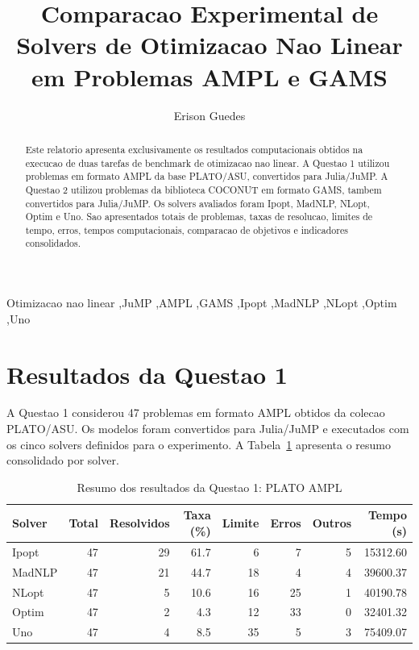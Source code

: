 \documentclass[preprint,12pt]{elsarticle}
\begin{document}
\begin{frontmatter}

\title{Comparacao Experimental de Solvers de Otimizacao Nao Linear em Problemas AMPL e GAMS}

\author[inst1]{Erison Guedes}
\address[inst1]{Programa de Mestrado, Disciplina de Otimizacao}

\begin{abstract}
Este relatorio apresenta exclusivamente os resultados computacionais obtidos na execucao de duas tarefas de benchmark de otimizacao nao linear. A Questao 1 utilizou problemas em formato AMPL da base PLATO/ASU, convertidos para Julia/JuMP. A Questao 2 utilizou problemas da biblioteca COCONUT em formato GAMS, tambem convertidos para Julia/JuMP. Os solvers avaliados foram Ipopt, MadNLP, NLopt, Optim e Uno. Sao apresentados totais de problemas, taxas de resolucao, limites de tempo, erros, tempos computacionais, comparacao de objetivos e indicadores consolidados.
\end{abstract}

\begin{keyword}
Otimizacao nao linear \sep JuMP \sep AMPL \sep GAMS \sep Ipopt \sep MadNLP \sep NLopt \sep Optim \sep Uno
\end{keyword}

\end{frontmatter}

\section{Resultados da Questao 1}

A Questao 1 considerou 47 problemas em formato AMPL obtidos da colecao PLATO/ASU. Os modelos foram convertidos para Julia/JuMP e executados com os cinco solvers definidos para o experimento. A Tabela~\ref{tab:q1_resumo} apresenta o resumo consolidado por solver.

\begin{table}[H]
\centering
\caption{Resumo dos resultados da Questao 1: PLATO AMPL}
\label{tab:q1_resumo}
\begin{tabular}{lrrrrrrr}
\toprule
Solver & Total & Resolvidos & Taxa (\%) & Limite & Erros & Outros & Tempo (s) \\
\midrule
Ipopt  & 47 & 29 & 61.7 & 6  & 7  & 5 & 15312.60 \\
MadNLP & 47 & 21 & 44.7 & 18 & 4  & 4 & 39600.37 \\
NLopt  & 47 & 5  & 10.6 & 16 & 25 & 1 & 40190.78 \\
Optim  & 47 & 2  & 4.3  & 12 & 33 & 0 & 32401.32 \\
Uno    & 47 & 4  & 8.5  & 35 & 5  & 3 & 75409.07 \\
\bottomrule
\end{tabular}
\end{table}
\end{document}
